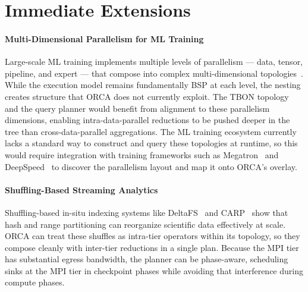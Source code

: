 


\section{Immediate Extensions}\label{sec:concl:extensions}

\paragraph{Multi-Dimensional Parallelism for ML Training}
Large-scale ML training implements multiple levels of parallelism --- data, tensor, pipeline, and
expert --- that compose into complex multi-dimensional
topologies~\cite{Gratt2024:Llama3Scale,Rahma2024:MLScale}.
While the execution model remains fundamentally BSP at each level, the nesting creates structure
that ORCA does not currently exploit.
The TBON topology and the query planner would benefit from alignment to these parallelism
dimensions, enabling intra-data-parallel reductions to be pushed deeper in the tree than
cross-data-parallel aggregations.
The ML training ecosystem currently lacks a standard way to construct and query these topologies
at runtime, so this would require integration with training frameworks such as
Megatron~\cite{Shoey2020:Megatron-LM} and DeepSpeed~\cite{:DeepSpeed}
to discover the parallelism layout and map it onto ORCA's overlay.

\paragraph{Shuffling-Based Streaming Analytics}
Shuffling-based in-situ indexing systems like DeltaFS~\cite{Zheng2018:DeltaFS} and
CARP~\cite{Jain2024:CARP} show that hash and range
partitioning can reorganize scientific data effectively at scale.
ORCA can treat these shuffles as intra-tier operators within its topology, so they compose cleanly
with inter-tier reductions in a single plan.
Because the MPI tier has substantial egress bandwidth, the planner can be
phase-aware, scheduling sinks at the MPI tier in checkpoint phases while avoiding that
interference during compute phases.

